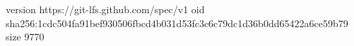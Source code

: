 version https://git-lfs.github.com/spec/v1
oid sha256:1cdc504fa91bef930506fbcd4b031d53fc3c6c79dc1d36b0dd65422a6ce59b79
size 9770
